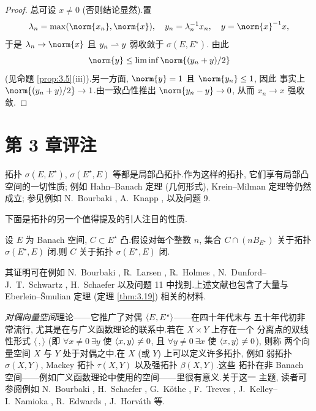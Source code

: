 \begin{proof}
总可设 $x\ne0$ (否则结论显然).置
\begin{equation*}
\lambda_n=\max(\norm{x_n},\norm{x}),\quad
y_n=\lambda_n^{-1}x_n,\quad y=\norm{x}^{-1}x,
\end{equation*}
于是 $\lambda_n\to\norm{x}$ 且 $y_n\rightharpoonup y$ 弱收敛于 $\sigma(E,E^\star)$.
由此
\begin{equation*}
\norm{y}\le\liminf\norm{(y_n+y)/2}
\end{equation*}
(见命题  \ref{prop:3.5}(iii)).另一方面, $\norm{y}=1$ 且 $\norm{y_n}\le1$, 因此
事实上 $\norm{(y_n+y)/2}\to1$.由一致凸性推出 $\norm{y_n-y}\to0$, 从而
$x_n\to x$ 强收敛.
\end{proof}

\section*{第 3 章评注}

拓扑 $\sigma(E,E^\star)$, $\sigma(E^\star,E)$ 等都是局部凸拓扑.作为这样的拓扑,
它们享有局部凸空间的一切性质; 例如 Hahn--Banach 定理 (几何形式), Krein--Milman 定理等仍然成立; 参见例如 N.~Bourbaki , A.~Knapp , 以及问题 9.

下面是\wstar{}拓扑的另一个值得提及的引人注目的性质.

\begin{startheorem}
\label{thm:3.33}
设 $E$ 为 Banach 空间, $C\subset E^\star$ 凸.假设对每个整数 $n$, 集合
$C\cap(nB_{E^\star})$ 关于拓扑 $\sigma(E^\star,E)$ 闭.则 $C$ 关于拓扑
$\sigma(E^\star,E)$ 闭.
\end{startheorem}

其证明可在例如 N.~Bourbaki , R.~Larsen , R.~Holmes , N.~Dunford--J.~T.~Schwartz , H.~Schaefer  以及问题 11 中找到.上述文献也包含了大量与
Eberlein--\v{S}mulian 定理 (定理  \ref{thm:3.19}) 相关的材料.

\emph{对偶向量空间}理论——它推广了对偶 $\left\langle E,E^\star\right\rangle$——在四十年代末与
五十年代初非常流行, 尤其是在与广义函数理论的联系中.若在 $X\times Y$ 上存在一个
分离点的双线性形式 $\langle\,,\rangle$ (即 $\forall x\ne0\ \exists y$ 使
$\left\langle x,y\right\rangle\ne0$, 且 $\forall y\ne0\ \exists x$ 使 $\left\langle x,y\right\rangle\ne0$), 则称
两个向量空间 $X$ 与 $Y$ 处于对偶之中.在 $X$ (或 $Y$) 上可以定义许多拓扑, 例如
弱拓扑 $\sigma(X,Y)$, Mackey 拓扑 $\tau(X,Y)$ 以及强拓扑 $\beta(X,Y)$.这些
拓扑在非 Banach 空间——例如广义函数理论中使用的空间——里很有意义.关于这一
主题, 读者可参阅例如 N.~Bourbaki , H.~Schaefer
, G.~K\"othe , F.~Treves , J.~Kelley--I.~Namioka , R.~Edwards , J.~Horv\'ath  等.

